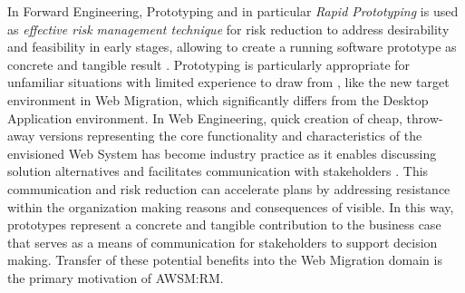In \gls{Forward Engineering}, Prototyping \autocite{Wallmueller2001SoftwareQuality} and in particular \emph{\gls{Rapid Prototyping}} \autocite{ISO/IEEE24765Vocabulary,Gordon1995RapidPrototyping} is used as \emph{effective \gls{risk management} technique} \autocite{Wallmueller2001SoftwareQuality} for risk reduction \autocite{ISO/IEEE24765Vocabulary} to address desirability and feasibility in early stages, allowing to create a running software prototype as concrete and tangible result \autocite{Alavi1984}.
\gls{Prototyping} is particularly appropriate for unfamiliar situations with limited experience to draw from \autocite{Tripp1990}, like the new target environment in \gls{Web Migration}, which significantly differs from the  \gls{Desktop Application} environment.
In \gls{Web Engineering}, quick creation of cheap, throw-away versions representing the core functionality and characteristics of the envisioned \gls{Web System} has become industry practice as it enables discussing solution alternatives and facilitates communication with stakeholders \autocite{Alavi1984,HCD2015}.
This communication and risk reduction can accelerate  plans \autocite{ForresterResearch2011Modernization} by addressing resistance within the organization \autocite{Khadka2014ProfessionalsModernization,Sneed2010ReMiP} making reasons and consequences of  visible.
In this way, prototypes represent a concrete and tangible contribution to the \gls{business case} that serves as a means of communication for stakeholders to support decision making.
Transfer of these potential benefits into the \gls{Web Migration} domain is the primary motivation of AWSM:RM.
\vspace{-5pt}

